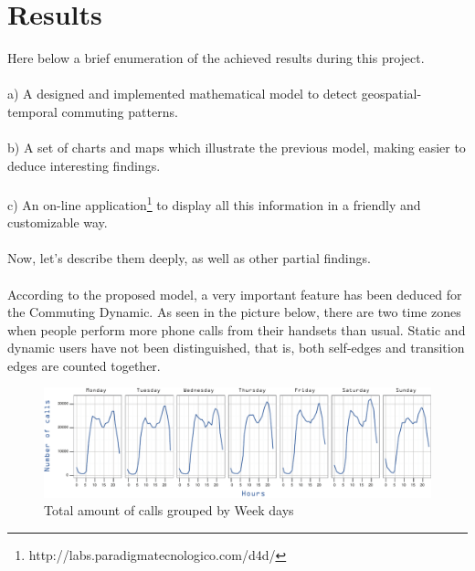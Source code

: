 \newpage
\section{Results}
\label{sec:results}

Here below a brief enumeration of the achieved results during this project.
\\
\\
a) A designed and implemented mathematical model to detect geospatial-temporal commuting patterns.
\\
\\
b) A set of charts and maps which illustrate the previous model, making easier to deduce interesting findings.
\\
\\
c) An on-line application\footnote{http://labs.paradigmatecnologico.com/d4d/} to display all this information in a friendly and customizable way.
\\
\\
Now, let's describe them deeply, as well as other partial findings.
\\
\\
According to the proposed model, a very important feature has been deduced for the Commuting Dynamic. As seen in the picture below, there are two time zones when people perform more phone calls from their handsets than usual. Static and dynamic users have not been distinguished, that is, both self-edges and transition edges are counted together.

\begin{figure}[h]
\begin{center}
\includegraphics[scale =0.8] {results/images/calls_number.pdf}
\caption{Total amount of calls grouped by Week days}
\label{fig:count_calls}
\end{center}
\end{figure}


